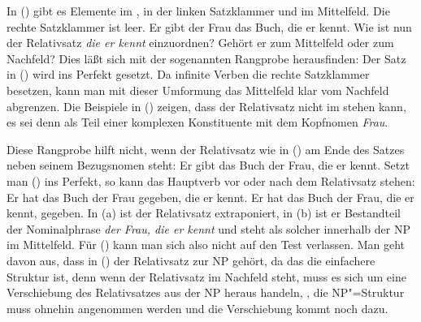 In () gibt es Elemente im \vf, in der linken Satzklammer
und im Mittelfeld. Die rechte Satzklammer ist leer.
\ea
Er gibt der Frau das Buch, die er kennt.
\z
Wie ist nun der Relativsatz \emph{die er kennt} einzuordnen? Gehört
er zum Mittelfeld oder zum Nachfeld?
Dies läßt sich mit der sogenannten Rangprobe \citep[]{Bech55a} herausfinden:
Der Satz in () wird ins Perfekt gesetzt. Da infinite Verben
die rechte Satzklammer besetzen, kann man mit dieser Umformung das Mittelfeld
klar vom Nachfeld abgrenzen. Die Beispiele in () zeigen,
dass der Relativsatz nicht im \mf stehen kann, es sei denn als Teil
einer komplexen Konstituente mit dem Kopfnomen \emph{Frau}.
\eal
{}
\zl

\noindent
Diese Rangprobe hilft nicht, wenn der Relativsatz wie in () am Ende des Satzes neben seinem Bezugsnomen steht:
\ea
Er gibt das Buch der Frau, die er kennt.
\z
Setzt man () ins Perfekt, so kann das Hauptverb vor oder nach dem Relativsatz stehen:
\eal
\ex Er hat das Buch der Frau gegeben, die er kennt.
\ex Er hat das Buch der Frau, die er kennt, gegeben.
\zl
In (a) ist der Relativsatz extraponiert, in (b) ist er Bestandteil der Nominalphrase
\emph{der Frau, die er kennt} und steht als solcher innerhalb der NP im Mittelfeld. Für () kann man sich also
nicht auf den Test verlassen. Man geht davon aus, dass in () der Relativsatz zur NP gehört,
da das die einfachere Struktur ist, denn wenn der Relativsatz im Nachfeld steht, muss es sich um eine
Verschiebung des Relativsatzes aus der NP heraus handeln, \dash, die NP"=Struktur muss ohnehin
angenommen werden und die Verschiebung kommt noch dazu.



